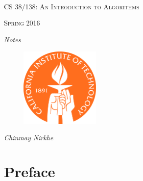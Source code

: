 \documentclass[10pt]{article}
\theoremstyle{plain}
\theoremstyle{definition}
\numberwithin{equation}{section}
\numberwithin{figure}{section}
\begin{document}
\begin{titlepage}
	\centering
	\ \\ \ \\ \ \\ \ \ \\ \ \\ \ \\ \ \\ \ \\ 
	{\scshape\LARGE CS 38/138: An Introduction to Algorithms \par}
	\vspace{1cm}
	{\scshape\Large Spring 2016\par}
	\vspace{0.5cm}
	{\Large\itshape Notes\par}
	\vspace{2cm}
	{\begin{figure}[!h]
\centering
\includegraphics[width=0.35\textwidth]{tech_seal.png}
\end{figure}}

	\vspace{3.5cm}
	{\Large\itshape Chinmay Nirkhe\par}
\end{titlepage}

\tableofcontents

\newpage

\section{Preface}
\end{document}
